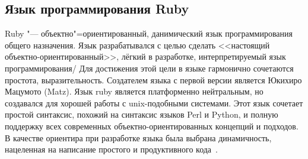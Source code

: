 \subsection{Язык программирования Ruby}
\label{sub:practice:ruby_overview}
Ruby "--- объектно"=ориентированный, данимический язык программирования общего назначения.
Язык разрабатывался с целью сделать <<настоящий объектно-ориентированный>>, лёгкий в разработке, интерпретируемый язык программирования/
Для достижения этой цели в языке гармонично сочетаются простота, выразительность.
Создателем языка с первой версии является  Юкихиро Мацумото (Matz).
Язык ruby является платформенно нейтральным, но создавался для хорошей работы с unix-подобными системами.
Этот язык сочетает простой синтаксис, похожий на синтаксис языков Perl и Python, и полную поддержку всех современных объектно-ориентированных концепций и подходов. В качестве ориентира при разработке языка была выбрана динамичность, нацеленная на написание простого и продуктивного кода~\cite{trpr_2011_ru}.

